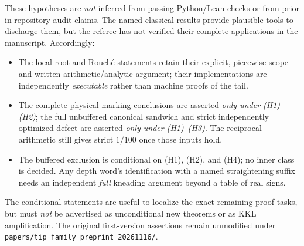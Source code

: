 These hypotheses are \emph{not} inferred from passing
Python/Lean checks or from prior in-repository audit
claims.  The named classical results provide plausible
tools to discharge them, but the referee has not verified
their complete applications in the manuscript.
Accordingly:
\begin{itemize}
\item The local root and Rouch\'e statements retain
their explicit, piecewise scope and written arithmetic/analytic
argument; their implementations are independently
\emph{executable} rather than machine proofs of the tail.
\item The complete physical marking conclusions are
asserted \emph{only under (H1)--(H2)}; the full
unbuffered canonical sandwich and strict
independently optimized defect are asserted
\emph{only under (H1)--(H3)}.  The reciprocal arithmetic
still gives strict $1/100$ once those inputs hold.
\item The buffered exclusion is conditional on
(H1), (H2), and (H4); no inner class is decided.
Any depth word's identification with a named
straightening suffix needs an independent \emph{full}
kneading argument beyond a table of real signs.
\end{itemize}

The conditional statements are useful to localize the exact
remaining proof tasks, but must \emph{not} be advertised
as unconditional new theorems or as KKL amplification.
The original first-version assertions remain unmodified
under \texttt{papers/tip\_family\_preprint\_20261116/}.
